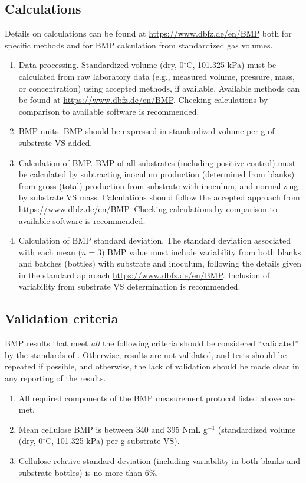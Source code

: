\documentclass[]{article}
\begin{document}
\subsection{Calculations}
Details on calculations can be found at \url{https://www.dbfz.de/en/BMP} both for specific methods and for BMP calculation from standardized gas volumes.
\begin{enumerate}
  \item Data processing.
    Standardized  volume (dry, 0$^\circ$C, 101.325 kPa) must be calculated from raw laboratory data (e.g., measured volume, pressure, mass, or concentration) using accepted methods, if available. 
    Available methods can be found at \url{https://www.dbfz.de/en/BMP}.
    Checking calculations by comparison to available software is recommended.
  \item BMP units.
    BMP should be expressed in standardized  volume per g of substrate VS added. 
  \item Calculation of BMP.
    BMP of all substrates (including positive control) must be calculated by subtracting inoculum  production (determined from blanks) from gross (total)  production from substrate with inoculum, and normalizing by substrate VS mass.
    Calculations should follow the accepted approach from \url{https://www.dbfz.de/en/BMP}.
    Checking calculations by comparison to available software is recommended.
  \item Calculation of BMP standard deviation.
    The standard deviation associated with each mean ($n = 3$) BMP value must include variability from both blanks and batches (bottles) with substrate and inoculum, following the details given in the standard approach \url{https://www.dbfz.de/en/BMP}.
    Inclusion of variability from substrate VS determination is recommended.
\end{enumerate}

\subsection{Validation criteria}
BMP results that meet \textit{all} the following criteria should be considered ``validated'' by the standards of \cite{iis2020}.
Otherwise, results are not validated, and tests should be repeated if possible, and otherwise, the lack of validation should be made clear in any reporting of the results.

\begin{enumerate}
  \item All required components of the BMP measurement protocol listed above are met.
  \item Mean cellulose BMP is between 340 and 395 NmL g$^{-1}$ (standardized  volume (dry, 0$^\circ$C, 101.325 kPa) per g substrate VS).
  \item Cellulose relative standard deviation (including variability in both blanks and substrate bottles) is no more than 6\%.
\end{enumerate}
\end{document}
